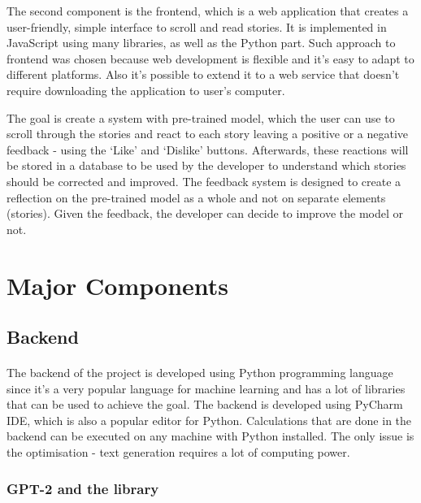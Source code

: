 \documentclass[12pt]{report}
\begin{document}
The second component is the frontend, which is a web application that creates a user-friendly, simple interface
to scroll and read stories. It is implemented in JavaScript using many libraries, as well as the Python part.
Such approach to frontend was chosen because web development is flexible and it's easy to adapt to different
platforms. Also it's possible to extend it to a web service that doesn't require downloading the application
to user's computer.

The goal is create a system with pre-trained model, which the user can use to scroll through the stories and 
react to each story leaving a positive or a negative feedback - using the `Like' and `Dislike' buttons. Afterwards,
these reactions will be stored in a database to be used by the developer to understand which stories should be
corrected and improved. The feedback system is designed to create a reflection on the pre-trained model as a whole and
not on separate elements (stories). Given the feedback, the developer can decide to improve the model or not.

\clearpage

\section*{Major Components}

\subsection*{Backend}
\paragraph{}
The backend of the project is developed using Python programming language since it's a very popular language for machine learning
and has a lot of libraries that can be used to achieve the goal. The backend is developed using PyCharm IDE, which is also
a popular editor for Python. Calculations that are done in the backend can be executed on any machine with Python 
installed. The only issue is the optimisation - text generation requires a lot of computing power.

\subsubsection*{GPT-2 and the library}
\end{document}
